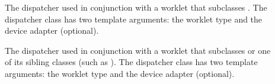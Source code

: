 \begin{description}
\item[] The dispatcher used in conjunction
  with a worklet that subclasses . The
  dispatcher class has two template arguments: the worklet type and the
  device adapter (optional).
\item[] The dispatcher used in
  conjunction with a worklet that subclasses
   or one of its sibling classes (such as
  ). The dispatcher class has two
  template arguments: the worklet type and the device adapter (optional).

\end{description}
